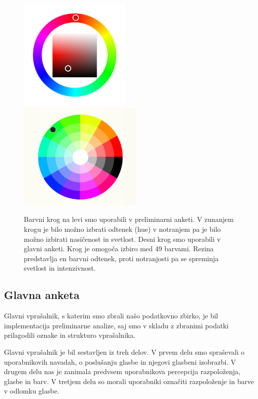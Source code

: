 \documentclass[a4paper, 12pt]{book}
\begin{document}
{\begin{figure}[ht]
\centering
\includegraphics[width=54mm]{colorwheelold.png}
\includegraphics[width=60mm]{colorwheel.png}

\caption{Barvni krog na levi smo uporabili v preliminarni anketi. V zunanjem krogu je bilo možno izbrati odtenek (hue) v notranjem pa je bilo možno izbirati nasičenost in svetlost. Desni krog smo uporabili v glavni anketi. Krog je omogoča izbiro med 49 barvami. Rezina predstavlja en barvni odtenek, proti notranjosti pa se spreminja svetlost in intenzivnost. }
\label{colorwheels}
\end{figure}

\subsection{Glavna anketa}
\label{glavnaanketa}

Glavni vprašalnik, s katerim smo zbrali našo podatkovno zbirko, je bil implementacija preliminarne analize, saj smo v skladu z zbranimi podatki prilagodili oznake in strukturo vprašalnika.

Glavni vprašalnik je bil sestavljen iz treh delov. V prvem delu smo spraševali o uporabnikovih navadah, o poslušanju glasbe in njegovi glasbeni izobrazbi. V drugem delu nas je zanimala predvsem uporabnikova percepcija razpoloženja, glasbe in barv. V tretjem delu so morali uporabniki označiti razpoloženje in barve v odlomku glasbe. 

}
\end{document}
